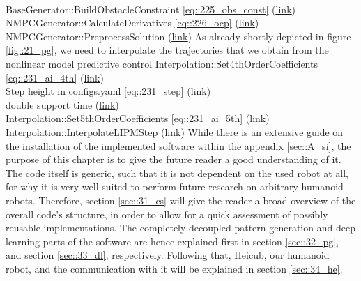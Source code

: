 \\
BaseGenerator::BuildObstacleConstraint \ref{eq::225_obs_const}
(\href{https://github.com/mhubii/nmpc_pattern_generator/blob/dc1f5a9366cbbbf76f1b02cada642f6ac9a04c89/libs/pattern_generator/src/base_generator.cpp#L1271}{\underline{link}})
\\
NMPCGenerator::CalculateDerivatives \ref{eq::226_ocp}
(\href{https://github.com/mhubii/nmpc_pattern_generator/blob/dc1f5a9366cbbbf76f1b02cada642f6ac9a04c89/libs/pattern_generator/src/nmpc_generator.cpp#L377}{\underline{link}})
\\
NMPCGenerator::PreprocessSolution
(\href{https://github.com/mhubii/nmpc_pattern_generator/blob/dc1f5a9366cbbbf76f1b02cada642f6ac9a04c89/libs/pattern_generator/src/nmpc_generator.cpp#L155}{\underline{link}})
As already shortly depicted in figure \ref{fig::21_pg}, we need to interpolate the trajectories that we obtain from the nonlinear model predictive control
Interpolation::Set4thOrderCoefficients \ref{eq::231_ai_4th}
(\href{https://github.com/mhubii/nmpc_pattern_generator/blob/c82c64a28da7527e75442764f585bd50a8f61ee9/libs/pattern_generator/src/interpolation.cpp#L779}{\underline{link}})
\\
Step height in configs.yaml \ref{eq::231_step}
(\href{https://github.com/mhubii/nmpc_pattern_generator/blob/c82c64a28da7527e75442764f585bd50a8f61ee9/libs/pattern_generator/configs.yaml#L22}{\underline{link}})
\\
double support time 
(\href{https://github.com/mhubii/nmpc_pattern_generator/blob/c82c64a28da7527e75442764f585bd50a8f61ee9/libs/pattern_generator/configs.yaml#L21}{\underline{link}})
\\
Interpolation::Set5thOrderCoefficients \ref{eq::231_ai_5th}
(\href{https://github.com/mhubii/nmpc_pattern_generator/blob/c82c64a28da7527e75442764f585bd50a8f61ee9/libs/pattern_generator/src/interpolation.cpp#L806}{\underline{link}})
\\
Interpolation::InterpolateLIPMStep
(\href{https://github.com/mhubii/nmpc_pattern_generator/blob/5a213044c927dc6aac9f7e32ce1e5fb472cd67bb/libs/pattern_generator/src/interpolation.cpp#L776}{\underline{link}})
\FloatBarrier
\label{sec::3_me}
While there is an extensive guide on the installation of the implemented software within the appendix \ref{sec::A_si}, the purpose of this chapter is to give the future reader a good understanding of it. The code itself is generic, such that it is not dependent on the used robot at all, for why it is very well-suited to perform future research on arbitrary humanoid robots. Therefore, section \ref{sec::31_cs} will give the reader a broad overview of the overall code's structure, in order to allow for a quick assessment of possibly reusable implementations. The completely decoupled pattern generation and deep learning parts of the software are hence explained first in section \ref{sec::32_pg}, and section \ref{sec::33_dl}, respectively. Following that, Heicub, our humanoid robot, and the communication with it will be explained in section \ref{sec::34_he}.

